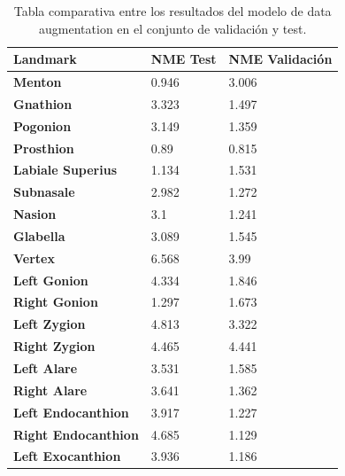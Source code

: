         \begin{table}[!ht]
            \centering
            \caption{Tabla comparativa entre los resultados del modelo de data augmentation en el conjunto de validación y test.}
            \begin{tabular}{|l|l|l|}
            \hline
                \cellcolor{gray!25}\textbf{Landmark} & \cellcolor{gray!25}\textbf{NME Test} & \cellcolor{gray!25}\textbf{NME Validación} \\ \hline
                \textbf{Menton} & \cellcolor{green!25}0.946 & 3.006 \\ \hline
                \textbf{Gnathion} & 3.323 & \cellcolor{green!25}1.497 \\ \hline
                \textbf{Pogonion} & 3.149 & \cellcolor{green!25}1.359 \\ \hline
                \textbf{Prosthion} & 0.89 & \cellcolor{green!25}0.815 \\ \hline
                \textbf{Labiale Superius} & \cellcolor{green!25}1.134 & 1.531 \\ \hline
                \textbf{Subnasale} & 2.982 & \cellcolor{green!25}1.272 \\ \hline
                \textbf{Nasion} & 3.1 & \cellcolor{green!25}1.241 \\ \hline
                \textbf{Glabella} & 3.089 & \cellcolor{green!25}1.545 \\ \hline
                \textbf{Vertex} & 6.568 & \cellcolor{green!25}3.99 \\ \hline
                \textbf{Left Gonion} & 4.334 & \cellcolor{green!25}1.846 \\ \hline
                \textbf{Right Gonion} & \cellcolor{green!25}1.297 & 1.673 \\ \hline
                \textbf{Left Zygion} & 4.813 & \cellcolor{green!25}3.322 \\ \hline
                \textbf{Right Zygion} & 4.465 & \cellcolor{green!25}4.441 \\ \hline
                \textbf{Left Alare} & 3.531 & \cellcolor{green!25}1.585 \\ \hline
                \textbf{Right Alare} & 3.641 & \cellcolor{green!25}1.362 \\ \hline
                \textbf{Left Endocanthion} & 3.917 & \cellcolor{green!25}1.227 \\ \hline
                \textbf{Right Endocanthion} & 4.685 & \cellcolor{green!25}1.129 \\ \hline
                \textbf{Left Exocanthion} & 3.936 & \cellcolor{green!25}1.186 \\ \hline

\end{tabular}
\end{table}
